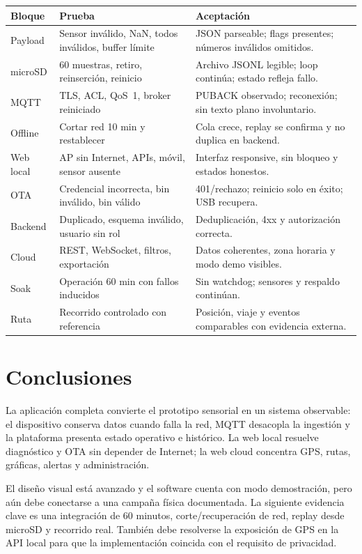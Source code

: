 \documentclass[11pt,a4paper,oneside]{report}
\begin{document}
\begin{longtable}{p{3.2cm}p{6.0cm}p{5.5cm}}
\toprule
\textbf{Bloque} & \textbf{Prueba} & \textbf{Aceptación}\\
\midrule
\endhead
Payload & Sensor inválido, NaN, todos inválidos, buffer límite & JSON parseable; flags presentes; números inválidos omitidos.\\
microSD & 60 muestras, retiro, reinserción, reinicio & Archivo JSONL legible; loop continúa; estado refleja fallo.\\
MQTT & TLS, ACL, QoS~1, broker reiniciado & PUBACK observado; reconexión; sin texto plano involuntario.\\
Offline & Cortar red 10 min y restablecer & Cola crece, replay se confirma y no duplica en backend.\\
Web local & AP sin Internet, APIs, móvil, sensor ausente & Interfaz responsive, sin bloqueo y estados honestos.\\
OTA & Credencial incorrecta, bin inválido, bin válido & 401/rechazo; reinicio solo en éxito; USB recupera.\\
Backend & Duplicado, esquema inválido, usuario sin rol & Deduplicación, 4xx y autorización correcta.\\
Cloud & REST, WebSocket, filtros, exportación & Datos coherentes, zona horaria y modo demo visibles.\\
Soak & Operación 60 min con fallos inducidos & Sin watchdog; sensores y respaldo continúan.\\
Ruta & Recorrido controlado con referencia & Posición, viaje y eventos comparables con evidencia externa.\\
\bottomrule
\end{longtable}

\chapter{Conclusiones}
La aplicación completa convierte el prototipo sensorial en un sistema observable: el
dispositivo conserva datos cuando falla la red, MQTT desacopla la ingestión y la
plataforma presenta estado operativo e histórico. La web local resuelve diagnóstico y
OTA sin depender de Internet; la web cloud concentra GPS, rutas, gráficas, alertas y
administración.

El diseño visual está avanzado y el software cuenta con modo demostración, pero aún
debe conectarse a una campaña física documentada. La siguiente evidencia clave es una
integración de 60 minutos, corte/recuperación de red, replay desde microSD y recorrido
real. También debe resolverse la exposición de GPS en la API local para que la
implementación coincida con el requisito de privacidad.
\end{document}

